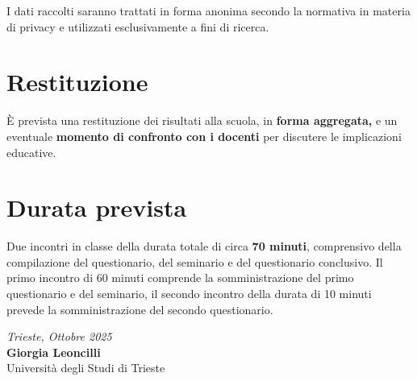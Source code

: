 \documentclass[12pt,a4paper]{article}
\begin{document}
I dati raccolti saranno trattati in forma anonima secondo la normativa in materia di privacy e utilizzati esclusivamente a fini di ricerca.

\section*{Restituzione}
È prevista una restituzione dei risultati alla scuola, in \textbf{forma aggregata,} e un eventuale \textbf{momento di confronto con i docenti} per discutere le implicazioni educative.

\section*{Durata prevista}
Due incontri in classe della durata totale di circa \textbf{70 minuti}, comprensivo della compilazione del questionario, del seminario e del questionario conclusivo. Il primo incontro di 60 minuti comprende la somministrazione del primo questionario e del seminario, il secondo incontro della durata di 10 minuti prevede la somministrazione del secondo questionario. 

\vfill
\begin{flushright}
\textit{Trieste, Ottobre 2025}\\[6pt]
\textbf{Giorgia Leoncilli}\\
Università degli Studi di Trieste
\end{flushright}
\end{document}
